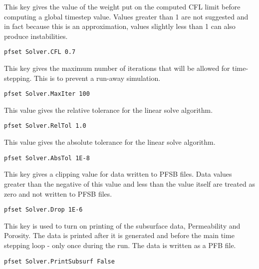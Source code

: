 {
This key gives the value of the weight put on the computed
CFL limit before computing a global timestep value.  Values
greater than 1 are not suggested and in fact because this is
an approximation, values slightly less than 1 can also produce
instabilities.
}
\begin{display}\begin{verbatim}
pfset Solver.CFL 0.7
\end{verbatim}\end{display}

{
This key gives the maximum number of iterations that will
be allowed for time-stepping.  This is to prevent a run-away
simulation.
}
\begin{display}\begin{verbatim}
pfset Solver.MaxIter 100
\end{verbatim}\end{display}



{
This value gives the relative tolerance for the linear
solve algorithm.
}
\begin{display}\begin{verbatim}
pfset Solver.RelTol 1.0
\end{verbatim}\end{display}

{
This value gives the absolute tolerance for the linear
solve algorithm.
}
\begin{display}\begin{verbatim}
pfset Solver.AbsTol 1E-8
\end{verbatim}\end{display}

{
This key gives a clipping value for data written to PFSB
files.  Data values greater than the negative of this
value and less than the value itself are treated as zero
and not written to PFSB files.
}
\begin{display}\begin{verbatim}
pfset Solver.Drop 1E-6
\end{verbatim}\end{display}

{
This key is used to turn on printing of the subsurface data,
Permeability and Porosity.  The data is printed after it is
generated and before the main time stepping loop - only once
during the run.  The data is written as a PFB file.
}
\begin{display}\begin{verbatim}
pfset Solver.PrintSubsurf False
\end{verbatim}\end{display}

